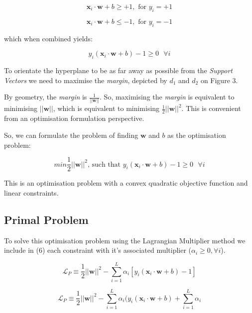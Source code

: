 \documentclass[10pt, a4paper,reqno]{amsart}
\begin{document}
\begin{equation}
\mathbf{x}_i\cdot\mathbf{w} + b \geq +1,\text{ for }y_i = +1
\end{equation}

\begin{equation}
\mathbf{x}_i\cdot\mathbf{w} + b \leq -1,\text{ for }y_i = -1
\end{equation}

which when combined yields:

\begin{equation}
y_i(\mathbf{x}_i\cdot\mathbf{w} + b) - 1 \geq 0\text{ }\forall{i}
\end{equation}

To orientate the hyperplane to be as far away as possible from the \emph{Support Vectors} we need to maximise the \emph{margin}, depicted by $d_1$ and $d_2$ on Figure 3.

By geometry, the \emph{margin} is $\frac{1}{||\mathbf{w}||}$. So, maximising the \emph{margin} is equivalent to minimising $||\mathbf{w}||$, which is equivalent to minimising $\frac{1}{2}||\mathbf{w}||^2$. This is convenient from an optimisation formulation perspective.

So, we can formulate the problem of finding $\mathbf{w}$ and $b$ as the optimisation problem:

\begin{equation}
min\frac{1}{2}||\mathbf{w}||^2\text{, such that }y_i(\mathbf{x}_i\cdot\mathbf{w} + b) - 1 \geq 0\text{ }\forall{i}
\end{equation}

This is an optimisation problem with a convex quadratic objective function and linear constraints.

\subsection{Primal Problem}

To solve this optimisation problem using the Lagrangian Multiplier method we include in (6) each constraint with it's associated multiplier ($\alpha_i \geq 0, \forall i$).

\begin{equation}
\mathcal{L}_P \equiv \frac{1}{2}||\mathbf{w}||^2 - \sum_{i=1}^{L}\alpha_i[y_i(\mathbf{x}_i\cdot\mathbf{w} + b) - 1]
\end{equation}

\begin{equation}
\mathcal{L}_P \equiv \frac{1}{2}||\mathbf{w}||^2 - \sum_{i=1}^{L}\alpha_i(y_i(\mathbf{x}_i\cdot\mathbf{w} + b) + \sum_{i=1}^{L}\alpha_i
\end{equation}
\end{document}
